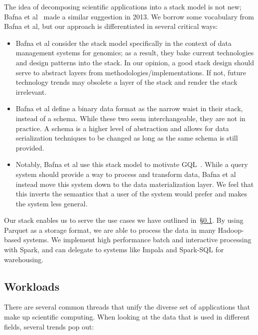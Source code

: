 \documentclass{acm_proc_article-sp}
\begin{document}
The idea of decomposing scientific applications into a stack model is not new; Bafna et al~\cite{bafna13}
made a similar suggestion in 2013. We borrow some vocabulary from Bafna et al, but our approach is
differentiated in several critical ways:

\begin{itemize}
\item Bafna et al consider the stack model specifically in the context of data management systems for
genomics; as a result, they bake current technologies and design patterns into the stack. In our opinion,
a good stack design should serve to abstract layers from methodologies/implementations. If not, future
technology trends may obsolete a layer of the stack and render the stack irrelevant.
\item Bafna et al define a binary data format as the narrow waist in their stack, instead of a schema.
While these two seem interchangeable, they are not in practice. A schema is a higher level of abstraction
and allows for data serialization techniques to be changed as long as the same schema is still provided.
\item Notably, Bafna et al use this stack model to motivate GQL~\cite{kozanitis14}. While a query system
should provide a way to process and transform data, Bafna et al instead move this system down to the
data materialization layer. We feel that this inverts the semantics that a user of the system would prefer
and makes the system less general.
\end{itemize}

Our stack enables us to serve the use cases we have outlined in~\S\ref{sec:workloads}. By using
Parquet as a storage format, we are able to process the data in many Hadoop-based systems. We
implement high performance batch and interactive processing with Spark, and can delegate to systems
like Impala and Spark-SQL for warehousing.

\subsection{Workloads}
\label{sec:workloads}

There are several common threads that unify the diverse set of applications that make up scientific
computing. When looking at the data that is used in different fields, several trends pop out:
\end{document}
